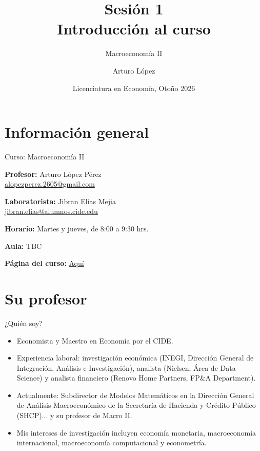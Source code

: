 \documentclass[aspectratio=169,11pt]{beamer}
\title[Macroeconomía II]{Sesión 1 \\ Introducción al curso}
\subtitle{Macroeconomía II}
\author[LECO]{Arturo López}
\institute[CIDE]{Centro de Investigación y Docencia Económicas (CIDE)}
\date[Otoño 2026]{Licenciatura en Economía, Otoño 2026}
\begin{document}

\begin{frame}
  \titlepage
\end{frame}


\section{Información general}

\begin{frame}[t]{Curso: Macroeconomía II}
  \vspace{0.6cm}

  \textbf{Profesor:} Arturo López Pérez\\
  \href{mailto:alopezperez.2605@gmail.com}{alopezperez.2605@gmail.com}

  \vspace{0.4cm}

  \textbf{Laboratorista:} Jibran Elias Mejia\\
  \href{mailto:jibran.elias@alumnos.cide.edu}{jibran.elias@alumnos.cide.edu}

  \vspace{0.4cm}

  \textbf{Horario:} Martes y jueves, de 8:00 a 9:30 hrs.

  \vspace{0.4cm}

  \textbf{Aula:} TBC

  \vspace{0.4cm}

  \textbf{Página del curso:} \href{https://arturolopezp.github.io/teachings/macroeconomics-ii/}{Aquí}
\end{frame}

\section{Su profesor}

\begin{frame}{¿Quién soy?}
  \begin{itemize}
    \item Economista y Maestro en Economía por el CIDE.
    \item Experiencia laboral: investigación económica (INEGI, Dirección General de Integración, Análisis e Investigación), analista (Nielsen, Área de Data Science) y analista financiero (Renovo Home Partners, FP\&A Department).

    \item Actualmente: Subdirector de Modelos Matemáticos en la Dirección General de Análisis Macroeconómico de la Secretaría de Hacienda y Crédito Público (SHCP)... y su profesor de Macro II.

    \item Mis intereses de investigación incluyen economía monetaria, macroeconomía internacional, macroeconomía computacional y econometría.
  \end{itemize}
\end{frame}
\end{document}
